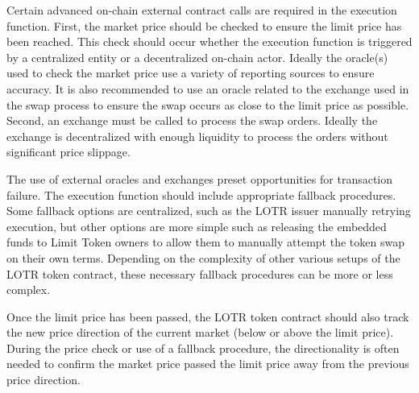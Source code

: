 \documentclass[12pt]{article}
\begin{document}
\begin{center}
            \end{center}
            Certain advanced on-chain external contract calls are required in the execution function. First, the market price should be checked to ensure the limit price has been reached. This check should occur whether the execution function is triggered by a centralized entity or a decentralized on-chain actor. Ideally the oracle(s) used to check the market price use a variety of reporting sources to ensure accuracy. It is also recommended to use an oracle related to the exchange used in the swap process to ensure the swap occurs as close to the limit price as possible. Second, an exchange must be called to process the swap orders. Ideally the exchange is decentralized with enough liquidity to process the orders without significant price slippage.

            The use of external oracles and exchanges preset opportunities for transaction failure. The execution function should include appropriate fallback procedures. Some fallback options are centralized, such as the LOTR issuer manually retrying execution, but other options are more simple such as releasing the embedded funds to Limit Token owners to allow them to manually attempt the token swap on their own terms. Depending on the complexity of other various setups of the LOTR token contract, these necessary fallback procedures can be more or less complex.
            
            Once the limit price has been passed, the LOTR token contract should also track the new price direction of the current market (below or above the limit price). During the price check or use of a fallback procedure, the directionality is often needed to confirm the market price passed the limit price away from the previous price direction.
\end{document}
